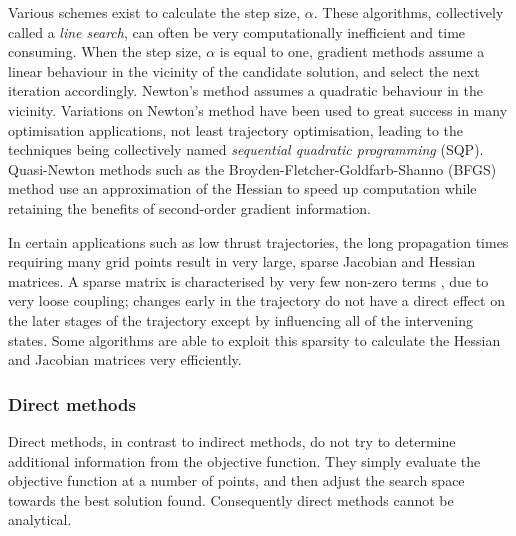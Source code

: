 Various schemes exist to calculate the step size, $\alpha$. These algorithms, collectively called a \emph{line search}, can often be very computationally inefficient and time consuming. When the step size, $\alpha$ is equal to one, gradient methods assume a linear behaviour in the vicinity of the candidate solution, and select the next iteration accordingly. Newton's method assumes a quadratic behaviour in the vicinity. Variations on Newton's method have been used to great success in many optimisation applications, not least trajectory optimisation, leading to the techniques being collectively named \emph{sequential quadratic programming} (SQP). Quasi-Newton methods such as the Broyden-Fletcher-Goldfarb-Shanno (BFGS) method use an approximation of the Hessian to speed up computation while retaining the benefits of second-order gradient information. 

In certain applications such as low thrust trajectories, the long propagation times requiring many grid points result in very large, sparse Jacobian and Hessian matrices. A sparse matrix is characterised by very few non-zero terms \parencite{Stoer2002}, due to very loose coupling; changes early in the trajectory do not have a direct effect on the later stages of the trajectory except by influencing all of the intervening states. Some algorithms are able to exploit this sparsity to calculate the Hessian and Jacobian matrices very efficiently.





\subsubsection{Direct methods}

Direct methods, in contrast to indirect methods, do not try to determine additional information from the objective function. They simply evaluate the objective function at a number of points, and then adjust the search space towards the best solution found. Consequently direct methods cannot be analytical. %

